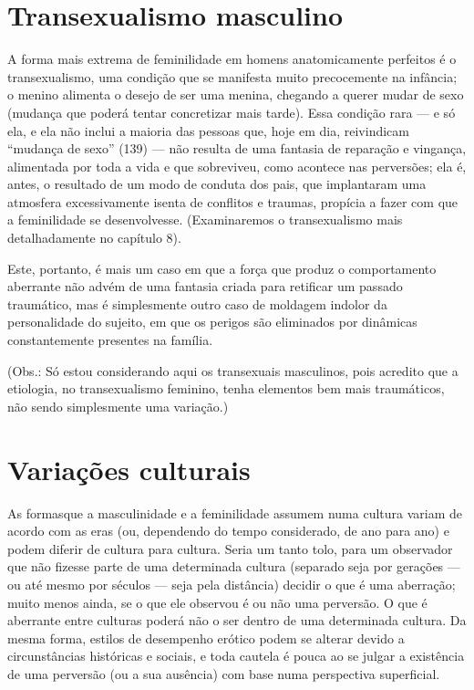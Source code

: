 \section{Transexualismo masculino}

A forma mais extrema de feminilidade em homens anatomicamente
perfeitos é o transexualismo,\idxtranse{} uma condição que se manifesta muito
precocemente na infância; o menino alimenta o desejo de ser uma menina,
chegando a querer mudar de sexo (mudança que poderá tentar concretizar
mais tarde). Essa condição rara --- e só ela, e ela não inclui a
maioria das pessoas que, hoje em dia, reivindicam
``mudança de sexo'' (139) --- não resulta de
uma fantasia de reparação e vingança, alimentada por toda a vida e que
sobreviveu, como acontece nas perversões; ela é, antes, o resultado de
um modo de conduta dos pais,\idxrelpctran{} que implantaram uma atmosfera
excessivamente isenta de conflitos e traumas, propícia a fazer com que
a feminilidade se desenvolvesse. (Examinaremos o transexualismo mais
detalhadamente no capítulo 8).

Este, portanto, é mais um caso em que a força que produz o
comportamento aberrante não advém de uma fantasia criada para retificar
um passado traumático, mas é simplesmente outro caso de moldagem
indolor da personalidade do sujeito, em que os perigos são eliminados
por dinâmicas constantemente presentes na família.

(Obs.: Só estou considerando aqui os transexuais masculinos, pois
acredito que a etiologia, no transexualismo feminino, tenha elementos
bem mais traumáticos, não sendo simplesmente uma variação.)

\section{Variações culturais}

As formas\idxvariacult[|(] que a masculinidade e a feminilidade assumem numa cultura
variam de acordo com as eras (ou, dependendo do tempo considerado, de
ano para ano) e podem diferir de cultura para cultura. Seria um tanto
tolo, para um observador que não fizesse parte de uma determinada
cultura (separado seja por gerações --- ou até mesmo por séculos --- seja
pela distância) decidir o que é uma aberração; muito menos ainda, se o
que ele observou é ou não uma perversão. O que é aberrante entre
culturas poderá não o ser dentro de uma determinada cultura. Da mesma
forma, estilos de desempenho erótico podem se alterar devido a
circunstâncias históricas e sociais, e toda cautela é pouca ao se
julgar a existência de uma perversão (ou a sua ausência) com base numa
perspectiva superficial.

